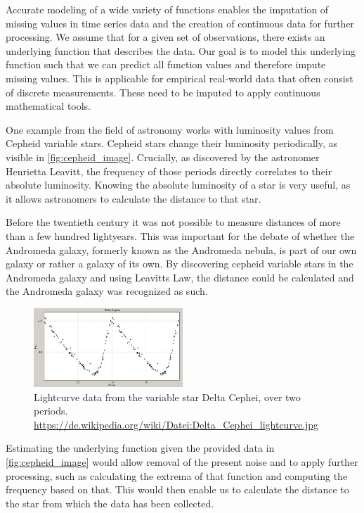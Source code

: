 Accurate modeling of a wide variety of functions enables the imputation of missing values in time series data and the creation of continuous data for further processing. We assume that for a given set of observations, there exists an underlying function that describes the data. Our goal is to model this underlying function such that we can predict all function values and therefore impute missing values. This is applicable for empirical real-world data that often consist of discrete measurements. These need to be imputed to apply continuous mathematical tools.

One example from the field of astronomy works with luminosity values from Cepheid variable stars. Cepheid stars change their luminosity periodically, as visible in \autoref{fig:cepheid_image}. Crucially, as discovered by the astronomer Henrietta Leavitt, the frequency of those periods directly correlates to their absolute luminosity. Knowing the absolute luminosity of a star is very useful, as it allows astronomers to calculate the distance to that star.

Before the twentieth century it was not possible to measure distances of more than a few hundred lightyears. This was important for the debate of whether the Andromeda galaxy, formerly known as the Andromeda nebula, is part of our own galaxy or rather a galaxy of its own. By discovering cepheid variable stars in the Andromeda galaxy and using Leavitts Law, the distance could be calculated and the Andromeda galaxy was recognized as such. \cite{gaßnerAstroBook}

\begin{figure}[h]
	\centering
	\includegraphics[width = 0.5\textwidth]{figures/Cephei}
	\caption{Lightcurve data from the variable star Delta Cephei, over two periods. \tiny\url{ https://de.wikipedia.org/wiki/Datei:Delta_Cephei_lightcurve.jpg}}
	\label{fig:cepheid_image}
\end{figure}

Estimating the underlying function given the provided data in \autoref{fig:cepheid_image} would allow removal of the present noise and to apply further processing, such as calculating the extrema of that function and computing the frequency based on that. This would then enable us to calculate the distance to the star from which the data has been collected.

